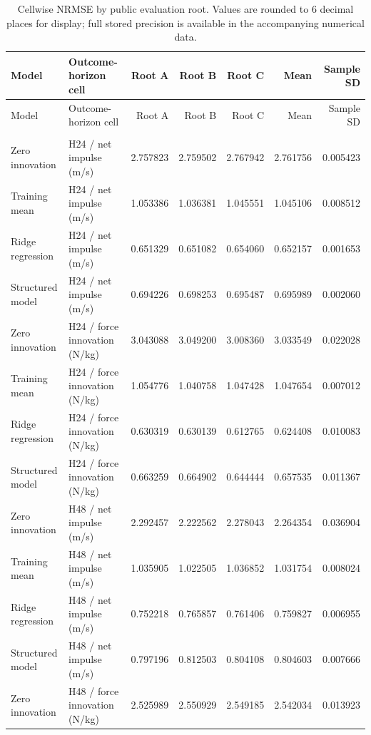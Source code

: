 \footnotesize
\setlength{\tabcolsep}{2.0pt}
\renewcommand{\arraystretch}{1.12}
\begin{longtable}{>{\raggedright\arraybackslash}p{0.80in}>{\raggedright\arraybackslash}p{1.62in}rrrrr}
\caption{Cellwise NRMSE by public evaluation root. Values are rounded to 6 decimal places for display; full stored precision is available in the accompanying numerical data.}\label{supp:sixcell}\\
\toprule
Model & Outcome-horizon cell & Root A & Root B & Root C & Mean & Sample SD \\
\midrule
\endfirsthead
\toprule
Model & Outcome-horizon cell & Root A & Root B & Root C & Mean & Sample SD \\
\midrule
\endhead
\midrule
\multicolumn{7}{r}{Continued on next page}\\
\endfoot
\bottomrule
\endlastfoot
Zero innovation & H24 / net impulse (m/s) & 2.757823 & 2.759502 & 2.767942 & 2.761756 & 0.005423 \\
Training mean & H24 / net impulse (m/s) & 1.053386 & 1.036381 & 1.045551 & 1.045106 & 0.008512 \\
Ridge regression & H24 / net impulse (m/s) & 0.651329 & 0.651082 & 0.654060 & 0.652157 & 0.001653 \\
Structured model & H24 / net impulse (m/s) & 0.694226 & 0.698253 & 0.695487 & 0.695989 & 0.002060 \\
Zero innovation & H24 / force innovation (N/kg) & 3.043088 & 3.049200 & 3.008360 & 3.033549 & 0.022028 \\
Training mean & H24 / force innovation (N/kg) & 1.054776 & 1.040758 & 1.047428 & 1.047654 & 0.007012 \\
Ridge regression & H24 / force innovation (N/kg) & 0.630319 & 0.630139 & 0.612765 & 0.624408 & 0.010083 \\
Structured model & H24 / force innovation (N/kg) & 0.663259 & 0.664902 & 0.644444 & 0.657535 & 0.011367 \\
Zero innovation & H48 / net impulse (m/s) & 2.292457 & 2.222562 & 2.278043 & 2.264354 & 0.036904 \\
Training mean & H48 / net impulse (m/s) & 1.035905 & 1.022505 & 1.036852 & 1.031754 & 0.008024 \\
Ridge regression & H48 / net impulse (m/s) & 0.752218 & 0.765857 & 0.761406 & 0.759827 & 0.006955 \\
Structured model & H48 / net impulse (m/s) & 0.797196 & 0.812503 & 0.804108 & 0.804603 & 0.007666 \\
Zero innovation & H48 / force innovation (N/kg) & 2.525989 & 2.550929 & 2.549185 & 2.542034 & 0.013923 \\

\end{longtable}
